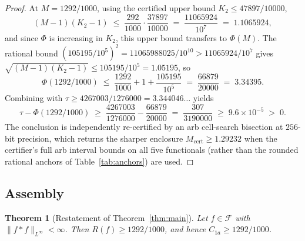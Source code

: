 \documentclass[11pt, letterpaper]{article}
\theoremstyle{paperplain}
\newtheorem{theorem}{Theorem}[section]
\theoremstyle{paperdef}
\newcommand{\Linf}{L^\infty}
\newcommand{\Mcert}{M_{\mathrm{cert}}}
\begin{document}
\begin{proof}
At $M=1292/1000$, using the certified upper bound $K_2\le 47897/10000$,
\[
  (M-1)(K_2-1) \;\le\; \frac{292}{1000}\cdot\frac{37897}{10000}
  \;=\; \frac{11065924}{10^{7}}
  \;=\; 1.1065924,
\]
and since $\Phi$ is increasing in $K_2$, this upper bound transfers
to $\Phi(M)$.  The rational bound
$(105195/10^{5})^{2}=11065988025/10^{10}>11065924/10^{7}$
gives $\sqrt{(M-1)(K_2-1)}\le 105195/10^{5}=1.05195$, so
\[
  \Phi(1292/1000)
  \;\le\; \frac{1292}{1000} + 1 + \frac{105195}{10^{5}}
  \;=\; \frac{66879}{20000}
  \;=\; 3.34395.
\]
Combining with $\tau\ge 4267003/1276000=3.344046\ldots$ yields
\[
  \tau-\Phi(1292/1000)
  \;\ge\; \frac{4267003}{1276000} - \frac{66879}{20000}
  \;=\; \frac{307}{3190000}
  \;\ge\; 9.6\times 10^{-5}\;>\;0.
\]
The conclusion is independently re-certified by an arb cell-search
bisection at $256$-bit precision, which returns the sharper enclosure
$\Mcert\ge 1.29232$ when the certifier's full arb interval bounds on
all five functionals (rather than the rounded rational anchors of
Table~\ref{tab:anchors}) are used.
\end{proof}

\subsection{Assembly}\label{subsec:proof-assembly}

\begin{theorem}[Restatement of Theorem~\ref{thm:main}]
\label{thm:main-restated}
Let $f\in\mathcal{F}$ with $\|f*f\|_{\Linf}<\infty$.  Then
$R(f)\ge 1292/1000$, and hence $C_{1a}\ge 1292/1000$.
\end{theorem}
\end{document}
